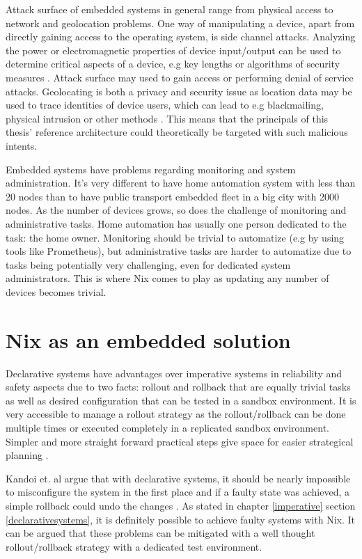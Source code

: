 Attack surface of embedded systems in general range from physical
access to network and geolocation problems. One way of manipulating a
device, apart from directly gaining access to the operating system,
is side channel attacks. Analyzing the power or electromagnetic
properties of device input/output can be used to determine critical
aspects of a device, e.g key lengths or algorithms of security
measures \cite{fysarakis2014embedded, serpanos2013security}. Attack
surface may used to gain access or performing denial of service
attacks. Geolocating is both a privacy and security issue as location
data may be used to trace identities of device users, which can lead
to e.g blackmailing, physical intrusion or other methods 
\cite{fysarakis2014embedded}. This means that the principals of this
thesis' reference architecture could theoretically be targeted with such malicious
intents.

Embedded systems have problems regarding monitoring and system
administration. It's very different to have home automation system
with less than 20 nodes than to have public transport embedded fleet
in a big city with 2000 nodes. As the number of devices grows, so does
the challenge of monitoring and administrative tasks. Home automation
has usually one person dedicated to the task: the home owner. Monitoring should be trivial to automatize (e.g by using
tools like Prometheus), but administrative tasks are harder to
automatize due to tasks being potentially very challenging, even for
dedicated system administrators. This is where Nix comes to play as
updating any number of devices becomes trivial.


\section{Nix as an embedded solution} \label{nixosassolution}

Declarative systems have advantages over imperative systems in
reliability and safety aspects due to two facts: rollout and rollback
that are equally trivial tasks as well as desired configuration that can be tested in a
sandbox environment. It is very accessible to manage a rollout strategy
as the rollout/rollback can be done multiple times or executed
completely in a replicated sandbox environment. Simpler and more straight forward practical steps give space for
easier strategical planning \cite{kandoi2021operating}.

Kandoi et. al argue that with declarative systems, it should be nearly
impossible to misconfigure the system in the first place and if a faulty
state was achieved, a simple rollback could undo the changes
\cite{kandoi2021operating}. As stated in chapter \ref{imperative}
section \ref{declarativesystems}, it is definitely possible to achieve
faulty systems with Nix. It can be argued that these problems can be mitigated
with a well thought rollout/rollback strategy with a dedicated test environment.

